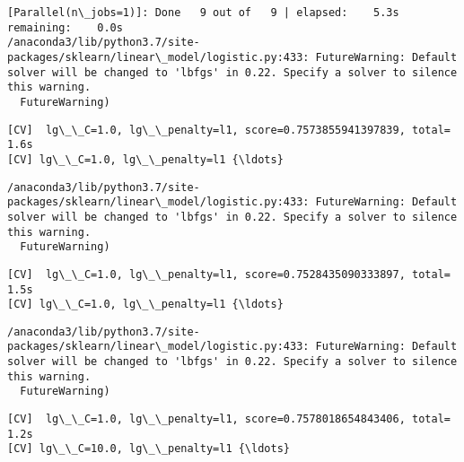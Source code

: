 \documentclass[11pt]{article}
\begin{document}
    \begin{Verbatim}[commandchars=\\\{\}]
[Parallel(n\_jobs=1)]: Done   9 out of   9 | elapsed:    5.3s remaining:    0.0s
/anaconda3/lib/python3.7/site-packages/sklearn/linear\_model/logistic.py:433: FutureWarning: Default solver will be changed to 'lbfgs' in 0.22. Specify a solver to silence this warning.
  FutureWarning)

    \end{Verbatim}

    \begin{Verbatim}[commandchars=\\\{\}]
[CV]  lg\_\_C=1.0, lg\_\_penalty=l1, score=0.7573855941397839, total=   1.6s
[CV] lg\_\_C=1.0, lg\_\_penalty=l1 {\ldots}

    \end{Verbatim}

    \begin{Verbatim}[commandchars=\\\{\}]
/anaconda3/lib/python3.7/site-packages/sklearn/linear\_model/logistic.py:433: FutureWarning: Default solver will be changed to 'lbfgs' in 0.22. Specify a solver to silence this warning.
  FutureWarning)

    \end{Verbatim}

    \begin{Verbatim}[commandchars=\\\{\}]
[CV]  lg\_\_C=1.0, lg\_\_penalty=l1, score=0.7528435090333897, total=   1.5s
[CV] lg\_\_C=1.0, lg\_\_penalty=l1 {\ldots}

    \end{Verbatim}

    \begin{Verbatim}[commandchars=\\\{\}]
/anaconda3/lib/python3.7/site-packages/sklearn/linear\_model/logistic.py:433: FutureWarning: Default solver will be changed to 'lbfgs' in 0.22. Specify a solver to silence this warning.
  FutureWarning)

    \end{Verbatim}

    \begin{Verbatim}[commandchars=\\\{\}]
[CV]  lg\_\_C=1.0, lg\_\_penalty=l1, score=0.7578018654843406, total=   1.2s
[CV] lg\_\_C=10.0, lg\_\_penalty=l1 {\ldots}

    \end{Verbatim}
\end{document}
